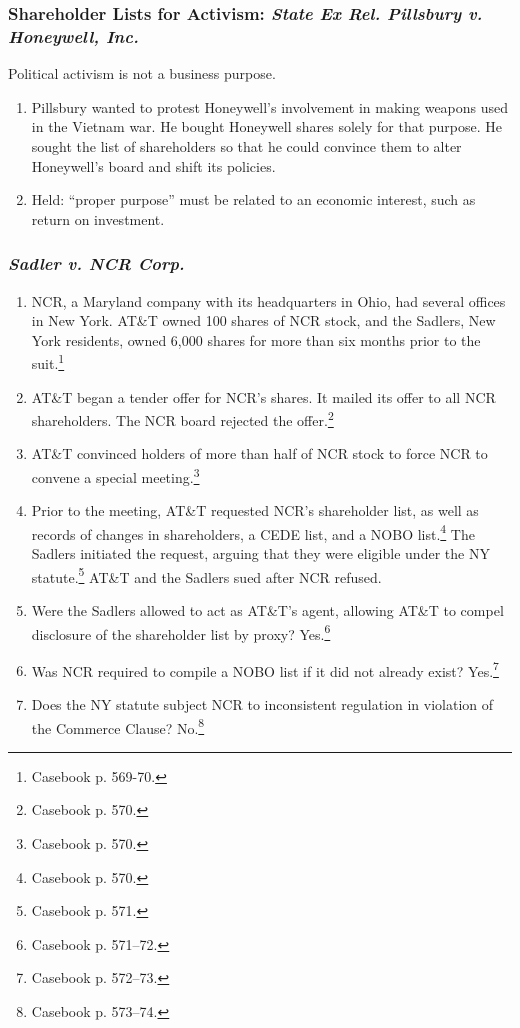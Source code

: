 \subsubsection{Shareholder Lists for Activism: \emph{State Ex Rel. Pillsbury v. 
Honeywell, Inc.}}

Political activism is not a business purpose.

\begin{enumerate}
    \item Pillsbury wanted to protest Honeywell's involvement in making weapons 
    used in the Vietnam war. He bought Honeywell shares solely for that purpose. 
    He sought the list of shareholders so that he could convince them to alter 
    Honeywell's board and shift its policies.
    \item Held: ``proper purpose'' must be related to an economic interest, such 
    as return on investment.
\end{enumerate}

\subsubsection{\emph{Sadler v. NCR Corp.}}

\begin{enumerate}
    \item NCR, a Maryland company with its headquarters in Ohio, had several 
    offices in New York. AT\&T owned 100 shares of NCR stock, and the Sadlers, 
    New York residents, owned 6,000 shares for more than six months prior to the 
    suit.\footnote{Casebook p. 569-70.}
    \item AT\&T began a tender offer for NCR's shares. It mailed its offer to 
    all NCR shareholders. The NCR board rejected the offer.\footnote{Casebook p. 
    570.}
    \item AT\&T convinced holders of more than half of NCR stock to force NCR to 
    convene a special meeting.\footnote{Casebook p. 570.}
    \item Prior to the meeting, AT\&T requested NCR's shareholder list, as well 
    as records of changes in shareholders, a CEDE list, and a NOBO 
    list.\footnote{Casebook p. 570.} The Sadlers initiated the request, arguing 
    that they were eligible under the NY statute.\footnote{Casebook p. 571.} 
    AT\&T and the Sadlers sued after NCR refused.
    \item Were the Sadlers allowed to act as AT\&T's agent, allowing AT\&T to 
    compel disclosure of the shareholder list by proxy? Yes.\footnote{Casebook 
    p. 571--72.}
    \item Was NCR required to compile a NOBO list if it did not already 
    exist? Yes.\footnote{Casebook p. 572--73.}
    \item Does the NY statute subject NCR to inconsistent regulation in 
    violation of the Commerce Clause? No.\footnote{Casebook p. 573--74.}
\end{enumerate}
